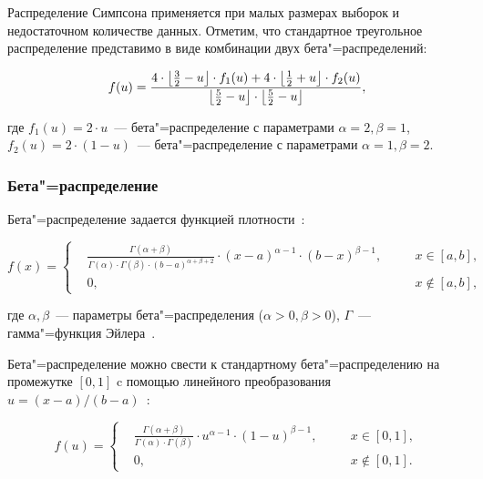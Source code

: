 \documentclass[a4paper, article, 14pt]{extarticle}
\begin{document}
Распределение Симпсона применяется при малых размерах выборок и недостаточном количестве данных. Отметим, что стандартное треугольное распределение представимо в виде комбинации двух бета"=распределений:

\begin{equation}\label{eq:simpson_distribtuion_with_beta_distribution}
	f(u) = \frac{4 \cdot \floor*{\frac{3}{2} - u} \cdot f_1(u) + 4 \cdot \floor*{\frac{1}{2} + u} \cdot f_2(u)}{\floor*{\frac{5}{2} - u} \cdot \floor*{\frac{5}{2} - u}},
\end{equation}

\noindent где $f_1(u) = 2 \cdot u$~--- бета"=распределение с параметрами $\alpha = 2, \beta = 1$,\\$f_2(u) = 2 \cdot (1 - u)$~--- бета"=распределение с параметрами $\alpha = 1, \beta = 2$.

\subsubsection{Бета"=распределение}\label{sec:beta_distribtuion}

Бета"=распределение задается функцией плотности~\cite{prohorov}:

\begin{equation}\label{eq:beta_distribtuion}
	f(x) =
	\left\{
		\begin{aligned}
			&\frac{\Gamma(\alpha + \beta)}{\Gamma(\alpha) \cdot \Gamma(\beta) \cdot (b - a)^{\alpha + \beta + 2}} \cdot (x - a)^{\alpha - 1} \cdot (b - x)^{\beta - 1}, \quad && x \in [a, b],\\
			&0, \quad && x \notin [a, b],
		\end{aligned}
	\right.
\end{equation}

\noindent где $\alpha, \beta$~--- параметры бета"=распределения ($\alpha > 0, \beta > 0$), $\Gamma$~--- гамма"=функция Эйлера~\cite{arsenin}.

Бета"=распределение можно свести к стандартному бета"=распределению на промежутке $[0, 1]$ c помощью линейного преобразования\\$u = (x - a) / (b - a)$~\cite{koroluk}:

\begin{equation}\label{eq:standard_beta_distribtuion}
	f(u) =
	\left\{
		\begin{aligned}
			&\frac{\Gamma(\alpha + \beta)}{\Gamma(\alpha) \cdot \Gamma(\beta)} \cdot u^{\alpha - 1} \cdot (1 - u)^{\beta - 1}, \quad && x \in [0, 1],\\
			&0, \quad && x \notin [0, 1].
		\end{aligned}
	\right.
\end{equation}
\end{document}
